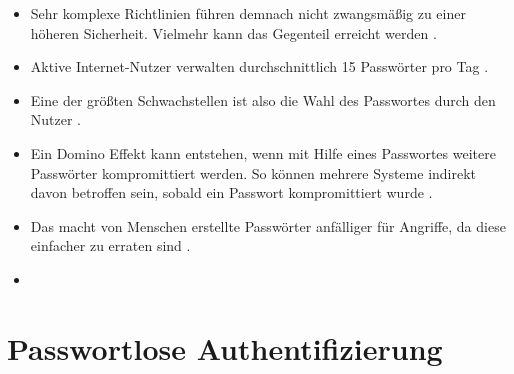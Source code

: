 \begin{itemize}
    \item Sehr komplexe Richtlinien führen demnach nicht zwangsmäßig zu einer höheren Sicherheit. Vielmehr kann das Gegenteil erreicht werden \cite{yildirim2019encouraging} \cite{morii2017research}.
    \item Aktive Internet-Nutzer verwalten durchschnittlich 15 Passwörter pro Tag \cite{ives2004domino}.
    \item Eine der größten Schwachstellen ist also die Wahl des Passwortes durch den Nutzer \cite{boonkrong2012security}.
    \item Ein Domino Effekt kann entstehen, wenn mit Hilfe eines Passwortes weitere Passwörter kompromittiert werden. So können mehrere Systeme indirekt davon betroffen sein, sobald ein Passwort kompromittiert wurde \cite{ives2004domino}.
    \item Das macht von Menschen erstellte Passwörter anfälliger für Angriffe, da diese einfacher zu erraten sind \cite{chanda2016password}.
    \item 
\end{itemize}

\section{Passwortlose Authentifizierung}

